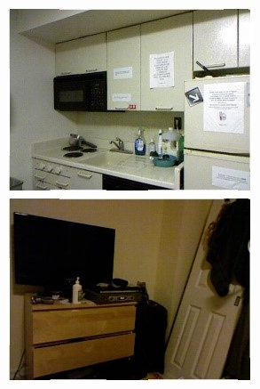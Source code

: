 \begin{figure}[htb]
  \centering
  \begin{subfigure}{0.24\linewidth}
  \begin{minipage}[b]{1\linewidth}
  \includegraphics[width=1\linewidth]{figure/Pixel_cla_nyu/1rgb.jpg}\vspace{4pt}
  \includegraphics[width=1\linewidth]{figure/Pixel_cla_nyu/2rgb.jpg}\vspace{4pt}

\end{minipage}
\end{subfigure}
\end{figure}
